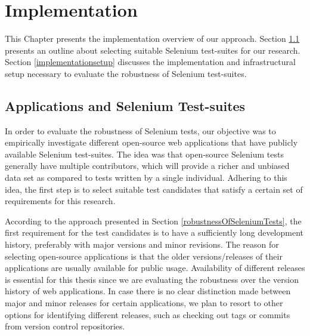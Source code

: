 \chapter{Implementation}
\label{Chapter4}

This Chapter presents the implementation overview of our approach. Section \ref{selectingCandidates} presents an outline about selecting suitable Selenium test-suites for our research. Section \ref{implementationsetup} discusses the implementation and infrastructural setup necessary to evaluate the robustness of Selenium test-suites. 


\section{Applications and Selenium Test-suites}
\label{selectingCandidates}
In order to evaluate the robustness of Selenium tests, our objective was to empirically investigate different open-source web applications that have publicly available Selenium test-suites. The idea was that open-source Selenium tests generally have multiple contributors, which will provide a richer and unbiased data set as compared to tests written by a single individual. Adhering to this idea, the first step is to select suitable test candidates that satisfy a certain set of requirements for this research. 

According to the approach presented in Section \ref{robustnessOfSeleniumTests}, the first requirement for the test candidates is to have a sufficiently long development history, preferably with major versions and minor revisions. The reason for selecting open-source applications is that the older versions/releases of their applications are usually available for public usage. Availability of different releases is essential for this thesis since we are evaluating the robustness over the version history of web applications. In case there is no clear distinction made between major and minor releases for certain applications, we plan to resort to other options for identifying different releases, such as checking out tags or commits from version control repositories. 


